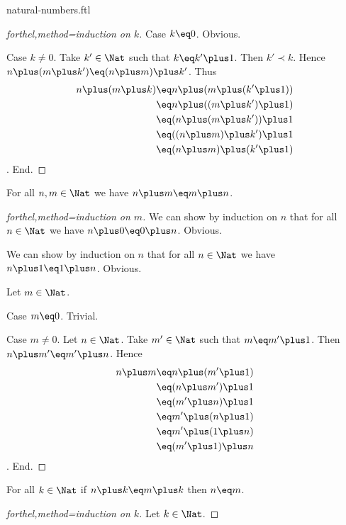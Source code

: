 \documentclass{naproche-library}
\begin{document}
\begin{smodule}{natural-numbers.ftl}
\begin{proof}[forthel,method=induction on $k$]
    Case $k\eq0$. Obvious.

    Case $k\neq0$.
      Take $k'\in\Nat$ such that $k\eq k'\plus1$.
      Then $k'\prec k$.
      Hence $n\plus(m\plus k')\eq(n\plus m)\plus k'$.
      Thus
      \begin{align*}
        n\plus(m\plus k)
          &\eq n\plus(m\plus(k'\plus1))\\
          &\eq n\plus((m\plus k')\plus1)\\
          &\eq (n\plus(m\plus k'))\plus1\\
          &\eq ((n\plus m)\plus k')\plus1\\
          &\eq (n\plus m)\plus(k'\plus1)
      \end{align*}.
    End.
  \end{proof}

  \begin{proposition}[forthel,title=Commutativity,id=PlusIsCommutativeProp]
    For all $n,m\in\Nat$ we have $n\plus m\eq m\plus n$.
  \end{proposition}
  \begin{proof}[forthel,method=induction on $m$]
    We can show by induction on $n$ that for all $n\in\Nat$ we have $n\plus0\eq0\plus n$.
    Obvious.

    We can show by induction on $n$ that for all $n\in\Nat$ we have $n\plus1\eq1\plus n$.
    Obvious.

    Let $m\in\Nat$.

    Case $m\eq0$. Trivial.

    Case $m\neq0$.
      Let $n\in\Nat$.
      Take $m'\in\Nat$ such that $m\eq m'\plus1$.
      Then $n\plus m'\eq m'\plus n$.
      Hence
      \begin{align*}
        n\plus m
          &\eq n\plus(m'\plus1)\\
          &\eq (n\plus m')\plus1\\
          &\eq (m'\plus n)\plus1\\
          &\eq m'\plus(n\plus1)\\
          &\eq m'\plus(1\plus n)\\
          &\eq (m'\plus1)\plus n
      \end{align*}.
    End.
  \end{proof}

  \begin{proposition}[forthel,title=Right cancellation,id=PlusIsRightCancellativeProp]
    For all $k\in\Nat$ if $n\plus k\eq m\plus k$ then $n\eq m$.
  \end{proposition}
  \begin{proof}[forthel,method=induction on $k$]
    Let $k\in\Nat$.


\end{proof}
\end{smodule}
\end{document}
